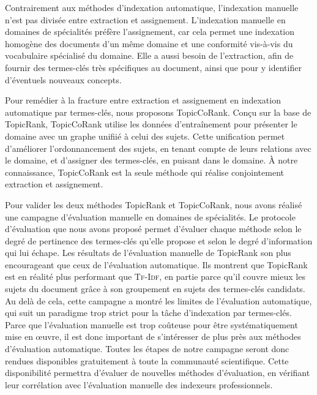     Contrairement aux méthodes d'indexation automatique, l'indexation manuelle
    n'est pas divisée entre extraction et assignement. L'indexation manuelle en
    domaines de spécialités préfère l'assignement, car cela permet une
    indexation homogène des documents d'un même domaine et une conformité
    vis-à-vis du vocabulaire spécialisé du domaine. Elle a aussi besoin de
    l'extraction, afin de fournir des termes-clés très spécifiques au document,
    ainsi que pour y identifier d'éventuels nouveaux concepts.

    Pour remédier à la fracture entre extraction et assignement en indexation
    automatique par termes-clés, nous proposons TopicCoRank. Conçu sur la base
    de TopicRank, TopicCoRank utilise les données d'entraînement pour présenter
    le domaine avec un graphe unifiié à celui des sujets. Cette unification
    permet d'améliorer l'ordonnancement des sujets, en tenant compte de leurs
    relations avec le domaine, et d'assigner des termes-clés, en puisant dans le
    domaine. À notre connaissance, TopicCoRank est la seule méthode qui réalise
    conjointement extraction et assignement.

    Pour valider les deux méthodes TopicRank et TopicCoRank, nous avons réalisé
    une campagne d'évaluation manuelle en domaines de spécialités. Le protocole
    d'évaluation que nous avons proposé permet d'évaluer chaque méthode selon le
    degré de pertinence des termes-clés qu'elle propose et selon le degré
    d'information qui lui échape. Les résultats de l'évaluation manuelle de
    TopicRank son plus encourageant que ceux de l'évaluation automatique. Ils
    montrent que TopicRank est en réalité plus performant que \textsc{Tf-Idf},
    en partie parce qu'il couvre mieux les sujets du document grâce à son
    groupement en sujets des termes-clés candidats. Au delà de cela, cette
    campagne a montré les limites de l'évaluation automatique, qui suit un
    paradigme trop strict pour la tâche d'indexation par termes-clés. Parce que
    l'évaluation manuelle est trop coûteuse pour être systématiquement mise en
    \oe{}uvre, il est donc important de s'intéresser de plus près aux méthodes
    d'évaluation automatique. Toutes les étapes de notre campagne seront donc
    rendues disponibles gratuitement à toute la communauté scientifique. Cette
    disponibilité permettra d'évaluer de nouvelles méthodes d'évaluation, en
    vérifiant leur corrélation avec l'évaluation manuelle des indexeurs
    professionnels.

